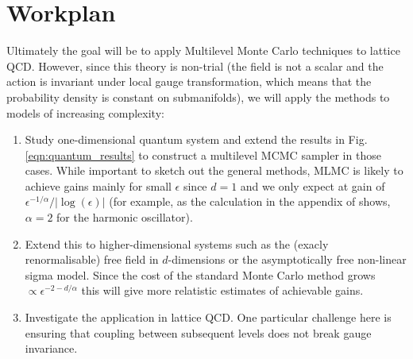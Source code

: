 \documentclass[11pt]{article}
\begin{document}
\section{Workplan}
Ultimately the goal will be to apply Multilevel Monte Carlo techniques to lattice QCD. However, since this theory is non-trial (the field is not a scalar and the action is invariant under local gauge transformation, which means that the probability density is constant on submanifolds), we will apply the methods to models of increasing complexity:
\begin{enumerate}
\item Study one-dimensional quantum system and extend the results in Fig. \ref{eqn:quantum_results} to construct a multilevel MCMC sampler in those cases. While important to sketch out the general methods, MLMC is likely to achieve gains mainly for small $\epsilon$ since $d=1$ and we only expect at gain of $\epsilon^{-1/\alpha}/|\log(\epsilon)|$ (for example, as the calculation in the appendix of \cite{Creutz1981} shows, $\alpha=2$ for the harmonic oscillator).
\item Extend this to higher-dimensional systems such as the (exacly renormalisable) free field in $d$-dimensions or the asymptotically free non-linear sigma model. Since the cost of the standard Monte Carlo method grows $\propto \epsilon^{-2-d/\alpha}$ this will give more relatistic estimates of achievable gains.
\item Investigate the application in lattice QCD. One particular challenge here is ensuring that coupling between subsequent levels does not break gauge invariance.
\end{enumerate}

{\footnotesize
  
}
\end{document}
